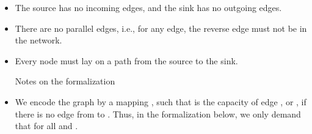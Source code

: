 \begin{isabellebody}
\begin{isamarkuptext}
%
\begin{itemize}%
\item The source has no incoming edges, and the sink has no outgoing edges.

\item There are no parallel edges, i.e., for any edge, the reverse edge must not be in the network.

\item Every node must lay on a path from the source to the sink.

Notes on the formalization

\item We encode the graph by a mapping , such that  is 
the capacity of edge , or , if there is no edge from  to .
Thus, in the formalization below, we only demand 
that  for all  and .


\end{itemize}
\end{isamarkuptext}
\end{isabellebody}

